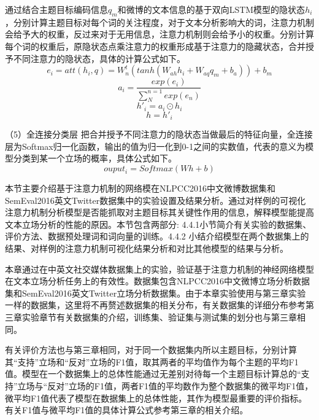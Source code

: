 通过结合主题目标编码信息$q_m$和微博的文本信息的基于双向LSTM模型的隐状态$h_i$，分别计算主题目标对每个词的关注程度，对于文本分析影响大的词，注意力机制会给予大的权重，反过来对于无用信息，注意力机制则会给予小的权重。分别计算每个词的权重后，原隐状态点乘注意力的权重形成基于注意力的隐藏状态，合并授予不同注意力的隐状态，具体的计算公式如下。
\begin{equation}\label{conv1} e_i=att(h_i,q)=W^t_n(tanh(W_{ah}h_i+W_{aq}q_m+b_a))+b_m \end{equation}
\begin{equation}\label{conv1} a_i=\frac{exp(e_i)}{\sum_{N}^{n=1}exp(e_n)} \end{equation}
\begin{equation}\label{conv1} h'_i=a_i \odot h_i \end{equation}
\begin{equation}\label{conv1} h = h'_i \end{equation}

（5）全连接分类层
把合并授予不同注意力的隐状态当做最后的特征向量，全连接层为Softmax归一化函数，输出的值为归一化到0-1之间的实数值，代表的意义为模型分类到某一个立场的概率，具体公式如下。
\begin{equation}\label{conv1} ouput_i=Softmax(Wh+b) \end{equation}




本节主要介绍基于注意力机制的网络模在NLPCC2016中文微博数据集和SemEval2016英文Twitter数据集中的实验设置及结果分析。通过对样例的可视化注意力机制分析模型是否能抓取对主题目标其关键性作用的信息，解释模型能提高文本立场分析的性能的原因。本节包含两部分: 4.4.1小节简介有关实验的数据集、评价方法、数据预处理词和词向量的训练。4.4.2 小结介绍模型在两个数据集上的结果、对样例的注意力机制可视化结果分析和对比其他模型的结果与分析。



本章通过在中英文社交媒体数据集上的实验，验证基于注意力机制的神经网络模型在文本立场分析任务上的有效性。数据集包含NLPCC2016中文微博立场分析数据集和SemEval2016英文Twitter立场分析数据集。由于本章实验使用与第三章实验一样的数据集，这里将不再赘述数据集的相关分布，有关数据集的详细分布参考第三章实验章节有关数据集的介绍，训练集、验证集与测试集的划分也与第三章相同。

有关评价方法也与第三章相同，对于同一个数据集内所以主题目标，分别计算其“支持”立场和“反对”立场的F1值，取其两者的平均值作为每个主题的平均F1值。模型在一个数据集上的总体性能通过无差别对待每一个主题目标计算总的“支持”立场与“反对”立场的F1值，两者F1值的平均数作为整个数据集的微平均F1值，微平均F1值代表了模型在数据集上的总体性能，其作为模型最重要的评价指标。有关F1值与微平均F1值的具体计算公式参考第三章的相关介绍。

